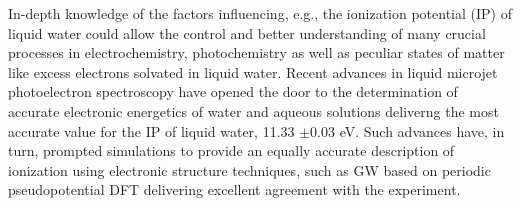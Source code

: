 \documentclass[notitlepage,12pt]{report}
\begin{document}
    In-depth knowledge of the factors influencing, e.g., the ionization potential (IP) of liquid water could allow the control and better understanding of many crucial processes in electrochemistry\supercite{marenich2014computational}, photochemistry\supercite{reuther1996primary,hu2021photochemical} as well as peculiar states of matter like excess electrons solvated in liquid water\supercite{ambrosio2017electronic}.  Recent advances in liquid microjet  photoelectron spectroscopy have opened the door to the determination of accurate electronic energetics of water and aqueous solutions \supercite{thurmer2021accurate,perry2020ionization,credidio2021quantitative,thurmer2021valence} deliverng the  most accurate value for the IP of liquid water, 11.33 $\pm$0.03 eV.  Such advances have, in turn, prompted simulations to provide an equally accurate description of ionization using electronic structure techniques, such as GW based on periodic pseudopotential DFT \supercite{gaiduk2018electron,ziaei2018probing,dal2014pseudopotentials} delivering excellent agreement with the experiment.
	
\end{document}
